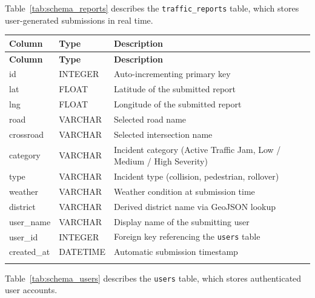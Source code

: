 \documentclass[12pt,a4paper]{report}
\begin{document}
Table~\ref{tab:schema_reports} describes the \texttt{traffic\_reports} table, which stores user-generated submissions in real time.

\renewcommand{\arraystretch}{1.4}

\begin{tabularx}{\textwidth}{|p{2.7cm}
                  |p{2.9cm}
                  |X|}


\hline
\textbf{Column} & \textbf{Type} & \textbf{Description} \\
\hline
\endfirsthead

\hline
\textbf{Column} & \textbf{Type} & \textbf{Description} \\
\hline
\endhead

id & INTEGER & Auto-incrementing primary key \\
\hline
lat & FLOAT & Latitude of the submitted report \\
\hline
lng & FLOAT & Longitude of the submitted report \\
\hline
road & VARCHAR & Selected road name \\
\hline
crossroad & VARCHAR & Selected intersection name \\
\hline
category & VARCHAR & Incident category (Active Traffic Jam, Low / Medium / High Severity) \\
\hline
type & VARCHAR & Incident type (collision, pedestrian, rollover) \\
\hline
weather & VARCHAR & Weather condition at submission time \\
\hline
district & VARCHAR & Derived district name via GeoJSON lookup \\
\hline
user\_name & VARCHAR & Display name of the submitting user \\
\hline
user\_id & INTEGER & Foreign key referencing the \texttt{users} table \\
\hline
created\_at & DATETIME & Automatic submission timestamp \\
\hline

\caption{\centering Database schema: \texttt{traffic\_reports} table}
\label{tab:schema_reports} \\

\end{tabularx}

Table~\ref{tab:schema_users} describes the \texttt{users} table, which stores authenticated user accounts.

\renewcommand{\arraystretch}{1.4}
\end{document}
